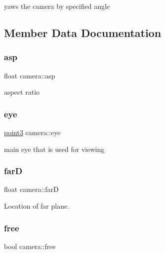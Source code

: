 yaws the camera by specified angle 

\subsection{Member Data Documentation}
\hypertarget{classcamera_aa7ca5df7a2626926b97db7d20f57de24}{}\label{classcamera_aa7ca5df7a2626926b97db7d20f57de24} 
\subsubsection{\texorpdfstring{asp}{asp}}
{\footnotesize\ttfamily float camera\+::asp\hspace{0.3cm}{\ttfamily [private]}}



aspect ratio 

\hypertarget{classcamera_aede6d35595e9ea8c98383915fb8f743d}{}\label{classcamera_aede6d35595e9ea8c98383915fb8f743d} 
\subsubsection{\texorpdfstring{eye}{eye}}
{\footnotesize\ttfamily \hyperlink{classpoint3}{point3} camera\+::eye\hspace{0.3cm}{\ttfamily [private]}}



main eye that is used for viewing 

\hypertarget{classcamera_a970214e0ae175df8fb37d25a8081cea3}{}\label{classcamera_a970214e0ae175df8fb37d25a8081cea3} 
\subsubsection{\texorpdfstring{farD}{farD}}
{\footnotesize\ttfamily float camera\+::farD\hspace{0.3cm}{\ttfamily [private]}}



Location of far plane. 

\hypertarget{classcamera_ab46ae945b6f431f98ba4de772c50d62d}{}\label{classcamera_ab46ae945b6f431f98ba4de772c50d62d} 
\subsubsection{\texorpdfstring{free}{free}}
{\footnotesize\ttfamily bool camera\+::free\hspace{0.3cm}{\ttfamily [private]}}



